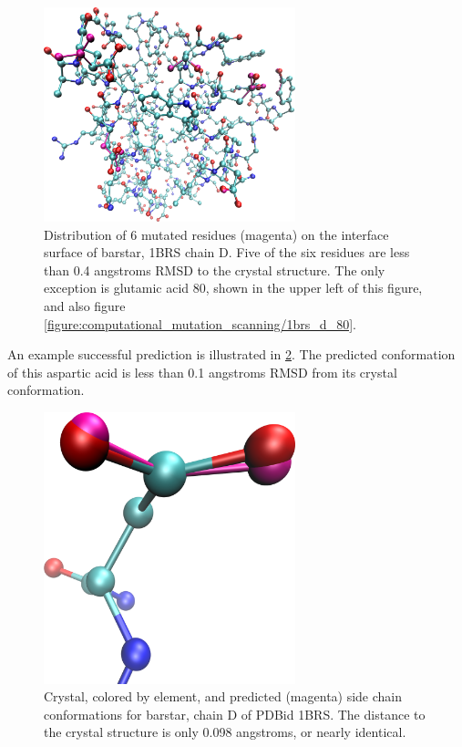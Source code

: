 \begin{figure}[h]
\centering
\includegraphics[width=0.65\textwidth,height=0.3\textheight,keepaspectratio]{figures/mutation_side_chain_images/1brs_all.png}
\caption{Distribution of 6 mutated residues (magenta) on the interface surface of barstar, 1BRS chain D.
Five of the six residues are less than 0.4 angstroms RMSD to the crystal structure.
The only exception is glutamic acid 80, shown in the upper left of this figure, and also figure \protect\ref{figure:computational_mutation_scanning/1brs_d_80}.}
\label{figure:computational_mutation_scanning/1brs_all}
\end{figure}

An example successful prediction is illustrated in \ref{figure:computational_mutation_scanning/1brs_d_35}.
The predicted conformation of this aspartic acid is less than 0.1 angstroms RMSD from its crystal conformation.
\begin{figure}[h]
    \centering
    \includegraphics[width=0.65\textwidth,height=0.3\textheight,keepaspectratio]{figures/mutation_side_chain_images/1brs_chain_d_35.png}
    \caption{Crystal, colored by element, and predicted (magenta) side chain conformations for barstar, chain D of PDBid 1BRS.
    The distance to the crystal structure is only 0.098 angstroms, or nearly identical.}
    \label{figure:computational_mutation_scanning/1brs_d_35}
\end{figure}

